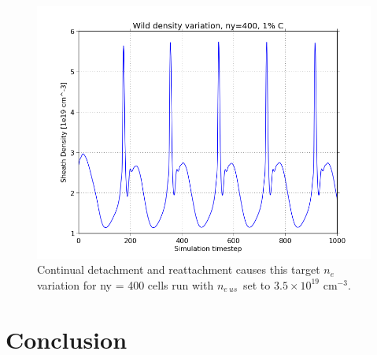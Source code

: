 \documentclass[11pt, twocolumn]{article}  %
\providecommand{\noNe}[1]{{${#1}\times 10^{19}$ cm$^{-3}$}} %
\providecommand{\neus}{$n_{e~us}$} %
\begin{document}
\begin{figure}
\includegraphics[scale=0.5]{Figures/sol1d/ny400r35netg.png}
\centering
\caption{Continual detachment and reattachment causes this target $n_e$ variation for ny = 400 cells run with \neus~set to \noNe{3.5}.}\label{fig:ny400r35netg}
\end{figure}


\section{Conclusion}\label{sec:Conclusion}




\printbibliography
\end{document}
